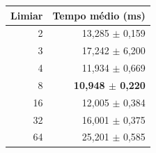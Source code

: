 \begin{tabular}{rr}
\toprule
Limiar & Tempo médio (ms) \\
\midrule
2 & 13,285 $\pm$ 0,159 \\
3 & 17,242 $\pm$ 6,200 \\
4 & 11,934 $\pm$ 0,669 \\
8 & \textbf{10,948 $\pm$ 0,220} \\
16 & 12,005 $\pm$ 0,384 \\
32 & 16,001 $\pm$ 0,375 \\
64 & 25,201 $\pm$ 0,585 \\
\bottomrule
\end{tabular}
